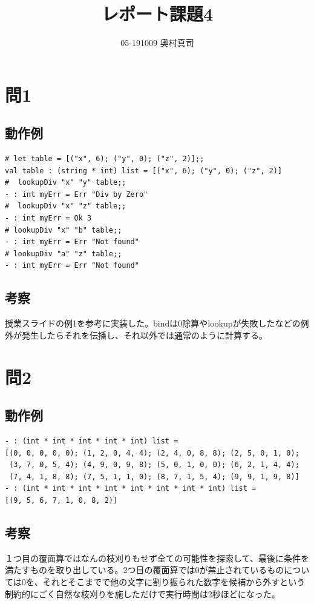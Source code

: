 \documentclass[11pt,a4paper]{jsarticle}
\title{レポート課題4}
\author{05-191009 奥村真司}
\date{}
\begin{document}
\maketitle
%
%
\section*{問1}
\subsection*{動作例}
\begin{lstlisting}[basicstyle=\ttfamily\footnotesize, frame=single]
# let table = [("x", 6); ("y", 0); ("z", 2)];;
val table : (string * int) list = [("x", 6); ("y", 0); ("z", 2)]
#  lookupDiv "x" "y" table;;
- : int myErr = Err "Div by Zero"
#  lookupDiv "x" "z" table;;
- : int myErr = Ok 3
# lookupDiv "x" "b" table;;
- : int myErr = Err "Not found"
# lookupDiv "a" "z" table;;
- : int myErr = Err "Not found"
\end{lstlisting}
\subsection*{考察}
授業スライドの例1を参考に実装した。bindは0除算やlookupが失敗したなどの例外が発生したらそれを伝播し、それ以外では通常のように計算する。
\section*{問2}
\subsection*{動作例}
\begin{lstlisting}[basicstyle=\ttfamily\footnotesize, frame=single]
- : (int * int * int * int * int) list =
[(0, 0, 0, 0, 0); (1, 2, 0, 4, 4); (2, 4, 0, 8, 8); (2, 5, 0, 1, 0);
 (3, 7, 0, 5, 4); (4, 9, 0, 9, 8); (5, 0, 1, 0, 0); (6, 2, 1, 4, 4);
 (7, 4, 1, 8, 8); (7, 5, 1, 1, 0); (8, 7, 1, 5, 4); (9, 9, 1, 9, 8)]
- : (int * int * int * int * int * int * int * int) list =
[(9, 5, 6, 7, 1, 0, 8, 2)]
\end{lstlisting}
\subsection*{考察}
１つ目の覆面算ではなんの枝刈りもせず全ての可能性を探索して、最後に条件を満たすものを取り出している。2つ目の覆面算では0が禁止されているものについては0を、それとそこまでで他の文字に割り振られた数字を候補から外すという制約的にごく自然な枝刈りを施しただけで実行時間は2秒ほどになった。
\end{document}
